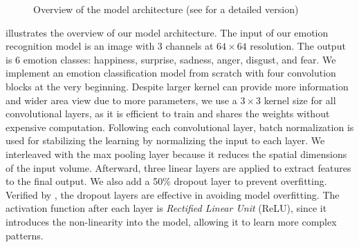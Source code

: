\begin{figure}[ht]
  \centering
  \caption{Overview of the model architecture (see  for a detailed version)} 
  \label{fig:model}
\end{figure}

 illustrates the overview of our model architecture. 
The input of our emotion recognition model is an image with 3 channels at $64 \times 64 $ resolution. 
The output is 6 emotion classes: happiness, surprise, sadness, anger, disgust, and fear. 
We implement an emotion classification model from scratch with four convolution blocks at the very beginning. 
Despite larger kernel can provide more information and wider area view due to more parameters, 
we use a $3 \times 3$ kernel size for all convolutional layers, 
as it is efficient to train and shares the weights without expensive computation. 
Following each convolutional layer, 
batch normalization is used for stabilizing the learning by normalizing the input to each layer. 
We interleaved with the max pooling layer because it reduces the spatial dimensions of the input volume. 
Afterward, three linear layers are applied to extract features to the final output. 
We also add a 50\% dropout layer to prevent overfitting. 
Verified by \citet{BarsoumZCZ16}, 
the dropout layers are effective in avoiding model overfitting. 
The activation function after each layer is \textit{Rectified Linear Unit} (ReLU), 
since it introduces the non-linearity into the model, 
allowing it to learn more complex patterns. 

